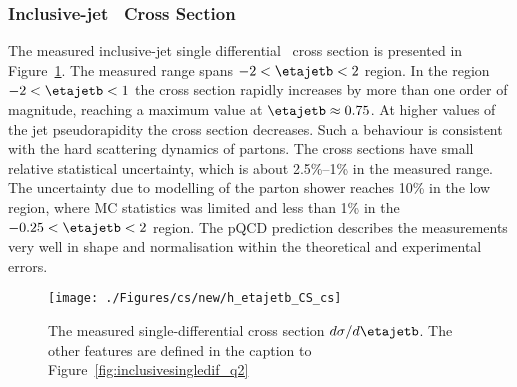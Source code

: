\subsubsection*{Inclusive-jet \dsdetajetb~Cross Section}
The measured inclusive-jet single differential \dsdetajetb~cross section is presented in Figure~\ref{fig:inclusivesingledif_eta}. The measured range spans $-2 < \etajetb < 2$ region. In the region  $-2 < \etajetb < 1$ the cross section rapidly increases by more than one order of magnitude, reaching a maximum value at $\etajetb \approx 0.75$. At higher values of the jet pseudorapidity the cross section decreases. Such a behaviour is consistent with the hard scattering dynamics of partons. The cross sections have small relative statistical uncertainty, which is about 2.5\%--1\% in the measured range. %
The uncertainty due to modelling of the parton shower reaches 10\% in the low \etajetb region, where MC statistics was limited and less than 1\% in the $-0.25 < \etajetb < 2$ region. The pQCD prediction describes the measurements very well in shape and normalisation within the theoretical and experimental errors.
\begin{figure}[p]
	\centering
		\texttt{[image: ./Figures/cs/new/h\_etajetb\_CS\_cs]}
	\caption{The measured single-differential cross section $d\sigma/d\etajetb$. The other features are defined in the caption to Figure~\ref{fig:inclusivesingledif_q2}}
	\label{fig:inclusivesingledif_eta}
\end{figure}

